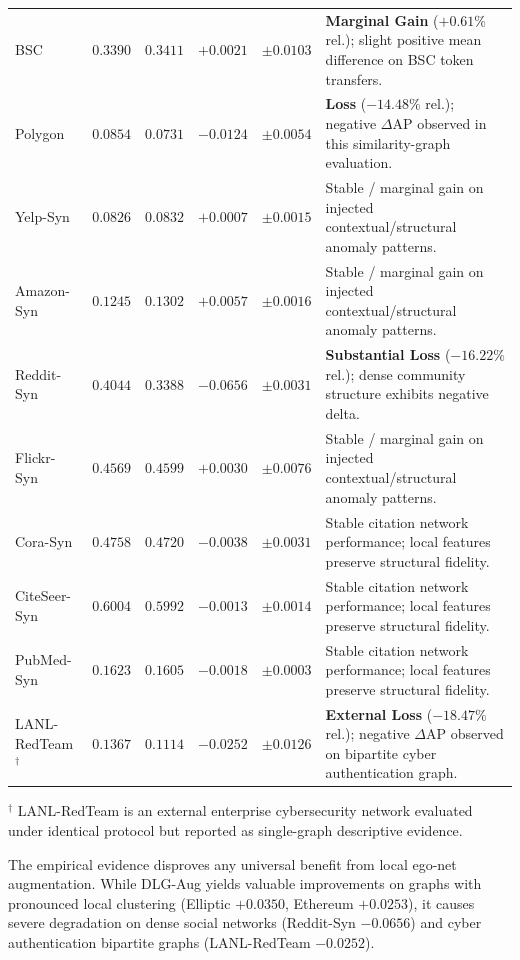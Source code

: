 \documentclass[11pt,a4paper]{article}
\begin{document}
\begin{table}[htbp]
\begin{tabularx}{\textwidth}{lrrrr>{\raggedright\arraybackslash}X}
BSC & $0.3390$ & $0.3411$ & $+0.0021$ & $\pm 0.0103$ & \textbf{Marginal Gain} ($+0.61\%$ rel.); slight positive mean difference on BSC token transfers. \\
Polygon & $0.0854$ & $0.0731$ & $-0.0124$ & $\pm 0.0054$ & \textbf{Loss} ($-14.48\%$ rel.); negative $\Delta\mathrm{AP}$ observed in this similarity-graph evaluation. \\
Yelp-Syn & $0.0826$ & $0.0832$ & $+0.0007$ & $\pm 0.0015$ & Stable / marginal gain on injected contextual/structural anomaly patterns. \\
Amazon-Syn & $0.1245$ & $0.1302$ & $+0.0057$ & $\pm 0.0016$ & Stable / marginal gain on injected contextual/structural anomaly patterns. \\
Reddit-Syn & $0.4044$ & $0.3388$ & $\mathbf{-0.0656}$ & $\pm 0.0031$ & \textbf{Substantial Loss} ($-16.22\%$ rel.); dense community structure exhibits negative delta. \\
Flickr-Syn & $0.4569$ & $0.4599$ & $+0.0030$ & $\pm 0.0076$ & Stable / marginal gain on injected contextual/structural anomaly patterns. \\
Cora-Syn & $0.4758$ & $0.4720$ & $-0.0038$ & $\pm 0.0031$ & Stable citation network performance; local features preserve structural fidelity. \\
CiteSeer-Syn & $0.6004$ & $0.5992$ & $-0.0013$ & $\pm 0.0014$ & Stable citation network performance; local features preserve structural fidelity. \\
PubMed-Syn & $0.1623$ & $0.1605$ & $-0.0018$ & $\pm 0.0003$ & Stable citation network performance; local features preserve structural fidelity. \\
LANL-RedTeam$^{\dagger}$ & $0.1367$ & $0.1114$ & $-0.0252$ & $\pm 0.0126$ & \textbf{External Loss} ($-18.47\%$ rel.); negative $\Delta\mathrm{AP}$ observed on bipartite cyber authentication graph. \\
\bottomrule
\end{tabularx}
\begin{tablenotes}\footnotesize
\item $^{\dagger}$ LANL-RedTeam is an external enterprise cybersecurity network evaluated under identical protocol but reported as single-graph descriptive evidence.
\end{tablenotes}
\end{table}


The empirical evidence disproves any universal benefit from local ego-net augmentation. While DLG-Aug yields valuable improvements on graphs with pronounced local clustering (Elliptic $+0.0350$, Ethereum $+0.0253$), it causes severe degradation on dense social networks (Reddit-Syn $-0.0656$) and cyber authentication bipartite graphs (LANL-RedTeam $-0.0252$).
\end{document}
